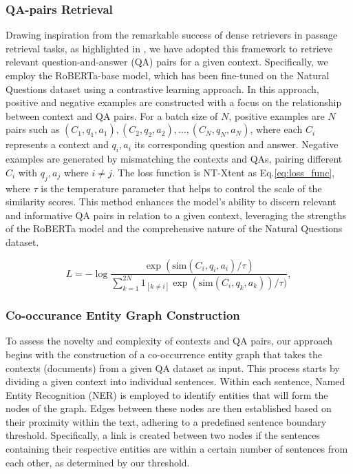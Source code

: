 \documentclass[11pt]{article}
\begin{document}
\subsubsection{QA-pairs Retrieval}
Drawing inspiration from the remarkable success of dense retrievers in passage retrieval tasks, as highlighted in \cite{DBLP:conf/acl/ChenFWB17}, we have adopted this framework to retrieve relevant question-and-answer (QA) pairs for a given context. Specifically, we employ the RoBERTa-base model, which has been fine-tuned on the Natural Questions dataset using a contrastive learning approach. In this approach, positive and negative examples are constructed with a focus on the relationship between context and QA pairs. For a batch size of \( N \), positive examples are \( N \) pairs such as \((C_1, q_1, a_1), (C_2, q_2, a_2), \ldots, (C_N, q_N, a_N)\), where each \( C_i \) represents a context and \( q_i, a_i \) its corresponding question and answer. Negative examples are generated by mismatching the contexts and QAs, pairing different \( C_i \) with \( q_j, a_j \) where \( i \neq j \). The loss function is NT-Xtent as Eq.\ref{eq:loss_func}, where $\tau$ is the temperature parameter that helps to control the scale of the similarity scores. This method enhances the model's ability to discern relevant and informative QA pairs in relation to a given context, leveraging the strengths of the RoBERTa model and the comprehensive nature of the Natural Questions dataset.

\begin{equation}
\label{eq:loss_func}
L = - \log \frac{\exp(\text{sim}(C_i, q_i, a_i) / \tau)}{\sum_{k=1}^{2N} {1}_{[k \neq i]} \exp(\text{sim}(C_i, q_k, a_k)) / \tau)},
\end{equation}








\subsubsection{Co-occurance Entity Graph Construction}

To assess the novelty and complexity of contexts and QA pairs, our approach begins with the construction of a co-occurrence entity graph that takes the contexts (documents) from a given QA dataset as input. This process starts by dividing a given context into individual sentences. Within each sentence, Named Entity Recognition (NER) is employed to identify entities that will form the nodes of the graph. Edges between these nodes are then established based on their proximity within the text, adhering to a predefined sentence boundary threshold. Specifically, a link is created between two nodes if the sentences containing their respective entities are within a certain number of sentences from each other, as determined by our threshold.
\end{document}
